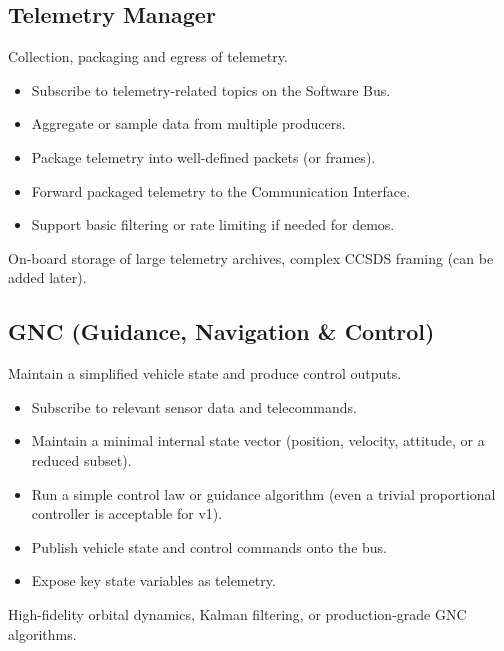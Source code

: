 \documentclass[11pt,a4paper]{article}
\begin{document}
\subsection{Telemetry Manager}
\begin{description}[style=nextline, leftmargin=1.5em]
    \item[Primary role] Collection, packaging and egress of telemetry.
    \item[Responsibilities]
    \begin{itemize}
        \item Subscribe to telemetry-related topics on the Software Bus.
        \item Aggregate or sample data from multiple producers.
        \item Package telemetry into well-defined packets (or frames).
        \item Forward packaged telemetry to the Communication Interface.
        \item Support basic filtering or rate limiting if needed for demos.
    \end{itemize}
    \item[Non-responsibilities] On-board storage of large telemetry archives, complex CCSDS framing (can be added later).
\end{description}

\subsection{GNC (Guidance, Navigation \& Control)}
\begin{description}[style=nextline, leftmargin=1.5em]
    \item[Primary role] Maintain a simplified vehicle state and produce control outputs.
    \item[Responsibilities]
    \begin{itemize}
        \item Subscribe to relevant sensor data and telecommands.
        \item Maintain a minimal internal state vector (position, velocity, attitude, or a reduced subset).
        \item Run a simple control law or guidance algorithm (even a trivial proportional controller is acceptable for v1).
        \item Publish vehicle state and control commands onto the bus.
        \item Expose key state variables as telemetry.
    \end{itemize}
    \item[Non-responsibilities] High-fidelity orbital dynamics, Kalman filtering, or production-grade GNC algorithms.
\end{description}
\end{document}
